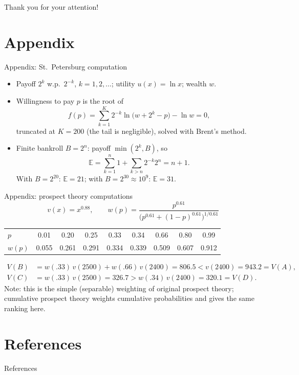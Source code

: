 \documentclass[12pt]{beamer}
\begin{document}
\begin{frame}[plain]
    \centering
    {\Huge Thank you for your attention!}
\end{frame}

\section{Appendix}

\begin{frame}{Appendix: St.\ Petersburg computation}
\small
\begin{itemize}
  \item Payoff $2^k$ w.p.\ $2^{-k}$, $k=1,2,\dots$; utility $u(x)=\ln x$; wealth $w$.
  \item Willingness to pay $p$ is the root of
  \[
  f(p)=\sum_{k=1}^{K}2^{-k}\ln\!\big(w+2^k-p\big)-\ln w=0,
  \]
  truncated at $K=200$ (the tail is negligible), solved with Brent's method.
  \item Finite bankroll $B=2^{n}$: payoff $\min(2^k,B)$, so
  \[
  \mathbb{E}=\sum_{k=1}^{n}1+\sum_{k>n}2^{-k}2^{n}=n+1 .
  \]
  With $B=2^{20}$: $\mathbb{E}=21$; with $B=2^{30}\approx10^9$: $\mathbb{E}=31$.
\end{itemize}
\end{frame}

\begin{frame}{Appendix: prospect theory computations}
\footnotesize
\[
v(x)=x^{0.88},\qquad w(p)=\frac{p^{0.61}}{\big(p^{0.61}+(1-p)^{0.61}\big)^{1/0.61}}
\]
\begin{center}
\small
\setlength{\tabcolsep}{3pt}\begin{tabular}{lcccccccc}
\toprule
$p$ & 0.01 & 0.20 & 0.25 & 0.33 & 0.34 & 0.66 & 0.80 & 0.99\\
$w(p)$ & 0.055 & 0.261 & 0.291 & 0.334 & 0.339 & 0.509 & 0.607 & 0.912\\
\bottomrule
\end{tabular}
\end{center}
\begin{align*}
V(B)&=w(.33)\,v(2500)+w(.66)\,v(2400)=806.5 < v(2400)=943.2=V(A),\\
V(C)&=w(.33)\,v(2500)=326.7 > w(.34)\,v(2400)=320.1=V(D).
\end{align*}
{\footnotesize Note: this is the simple (separable) weighting of original prospect theory; cumulative prospect theory weights cumulative probabilities and gives the same ranking here.}
\end{frame}


\section*{References}

\begin{frame}[allowframebreaks]{References}
  \nocite{*}
  \printbibliography
\end{frame}
\end{document}
